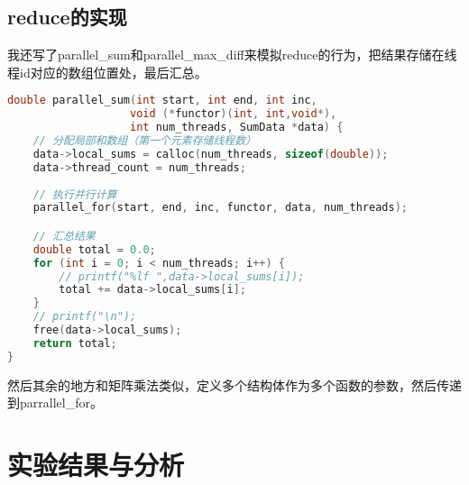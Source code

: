 \documentclass{SYSUReport}
\begin{document}
\subsection{reduce的实现}
我还写了parallel\_sum和parallel\_max\_diff来模拟reduce的行为，把结果存储在线程id对应的数组位置处，最后汇总。
\begin{lstlisting}[language=c]
double parallel_sum(int start, int end, int inc, 
                   void (*functor)(int, int,void*), 
                   int num_threads, SumData *data) {
    // 分配局部和数组（第一个元素存储线程数）
    data->local_sums = calloc(num_threads, sizeof(double));
    data->thread_count = num_threads;
    
    // 执行并行计算
    parallel_for(start, end, inc, functor, data, num_threads);

    // 汇总结果
    double total = 0.0;
    for (int i = 0; i < num_threads; i++) {
        // printf("%lf ",data->local_sums[i]);
        total += data->local_sums[i];
    }
    // printf("\n");
    free(data->local_sums);
    return total;
}
\end{lstlisting}
然后其余的地方和矩阵乘法类似，定义多个结构体作为多个函数的参数，然后传递到parrallel\_for。
\section{实验结果与分析}
\end{document}
